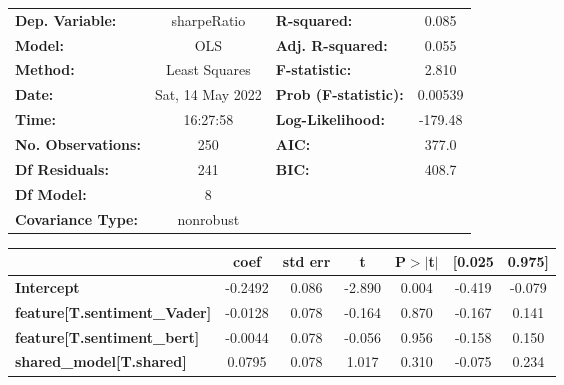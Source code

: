 \begin{center}
\begin{tabular}{lclc}
\toprule
\textbf{Dep. Variable:}                       &   sharpeRatio    & \textbf{  R-squared:         } &     0.085   \\
\textbf{Model:}                               &       OLS        & \textbf{  Adj. R-squared:    } &     0.055   \\
\textbf{Method:}                              &  Least Squares   & \textbf{  F-statistic:       } &     2.810   \\
\textbf{Date:}                                & Sat, 14 May 2022 & \textbf{  Prob (F-statistic):} &  0.00539    \\
\textbf{Time:}                                &     16:27:58     & \textbf{  Log-Likelihood:    } &   -179.48   \\
\textbf{No. Observations:}                    &         250      & \textbf{  AIC:               } &     377.0   \\
\textbf{Df Residuals:}                        &         241      & \textbf{  BIC:               } &     408.7   \\
\textbf{Df Model:}                            &           8      & \textbf{                     } &             \\
\textbf{Covariance Type:}                     &    nonrobust     & \textbf{                     } &             \\
\bottomrule
\end{tabular}
\begin{tabular}{lcccccc}
                                              & \textbf{coef} & \textbf{std err} & \textbf{t} & \textbf{P$> |$t$|$} & \textbf{[0.025} & \textbf{0.975]}  \\
\midrule
\textbf{Intercept}                            &      -0.2492  &        0.086     &    -2.890  &         0.004        &       -0.419    &       -0.079     \\
\textbf{feature[T.sentiment\_Vader]}          &      -0.0128  &        0.078     &    -0.164  &         0.870        &       -0.167    &        0.141     \\
\textbf{feature[T.sentiment\_bert]}           &      -0.0044  &        0.078     &    -0.056  &         0.956        &       -0.158    &        0.150     \\
\textbf{shared\_model[T.shared]}              &       0.0795  &        0.078     &     1.017  &         0.310        &       -0.075    &        0.234     \\

\end{tabular}
\end{center}
